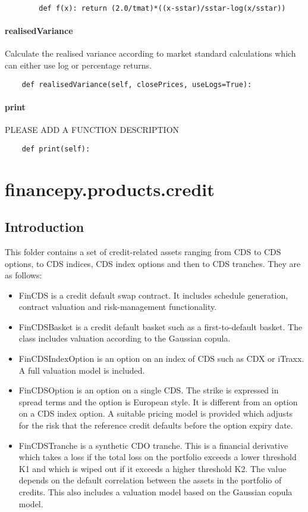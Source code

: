 \documentclass[twoside,11pt]{book}
\begin{document}
\begin{lstlisting}
        def f(x): return (2.0/tmat)*((x-sstar)/sstar-log(x/sstar))
\end{lstlisting}

\subsubsection*{{\bf realisedVariance}}
Calculate the realised variance according to market standard calculations which can either use log or percentage returns. 

\begin{lstlisting}
    def realisedVariance(self, closePrices, useLogs=True):
\end{lstlisting}

\subsubsection*{{\bf print}}
PLEASE ADD A FUNCTION DESCRIPTION

\begin{lstlisting}
    def print(self):
\end{lstlisting}


\chapter{financepy.products.credit}
\section{Introduction}

This folder contains a set of credit-related assets ranging from CDS to CDS options, to CDS indices, CDS index options and then to CDS tranches. They are as follows:
\begin{itemize}
\item{ FinCDS is a credit default swap contract. It includes schedule generation, contract valuation and risk-management functionality.
}
\item{ FinCDSBasket is a credit default basket such as a first-to-default basket. The class includes valuation according to the Gaussian copula.
}
\item{ FinCDSIndexOption is an option on an index of CDS such as CDX or iTraxx. A full valuation model is included.
}
\item{ FinCDSOption is an option on a single CDS. The strike is expressed in spread terms and the option is European style. It is different from an option on a CDS index option. A suitable pricing model is provided which adjusts for the risk that the reference credit defaults before the option expiry date.
}
\item{ FinCDSTranche is a synthetic CDO tranche. This is a financial derivative which takes a loss if the total loss on the portfolio exceeds a lower threshold K1 and which is wiped out if it exceeds a higher threshold K2. The value depends on the default correlation between the assets in the portfolio of credits. This also includes a valuation model based on the Gaussian copula model.
}
\end{itemize}
\newpage
\end{document}
